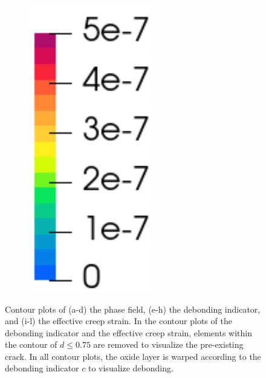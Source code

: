 \begin{figure}[!htb]
\begin{subfigure}[b]{0.1\textwidth}
    \includegraphics[width=0.6\textwidth]{Chapter5/figures/spallation/colorbar_ep_seed}
    \vspace{4em}
  \end{subfigure}
  \caption[Simulation of spallation with a pre-existing crack during a full-shutdown transition.]{Contour plots of (a-d) the phase field, (e-h) the debonding indicator, and (i-l) the effective creep strain. In the contour plots of the debonding indicator and the effective creep strain, elements within the contour of $d \leqslant 0.75$ are removed to visualize the pre-existing crack. In all contour plots, the oxide layer is warped according to the debonding indicator $c$ to visualize debonding. }
  \label{fig: Chapter5/spallation/animation_seed_2}
\end{figure}
